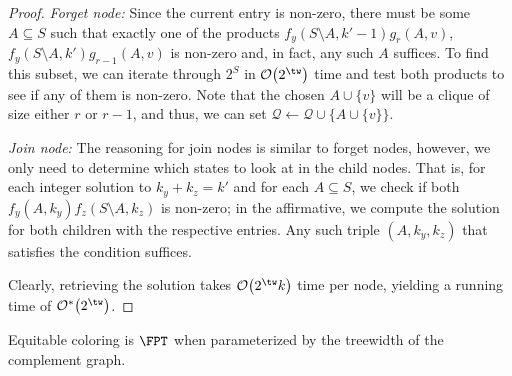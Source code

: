 \begin{proof}
    \emph{Forget node:} Since the current entry is non-zero, there must be some $A \subseteq S$ such that exactly one of the products $f_y(S \setminus A, k' - 1)g_r(A, v)$, $f_y(S \setminus A, k')g_{r-1}(A, v)$ is non-zero and, in fact, any such $A$ suffices.
    To find this subset, we can iterate through $2^S$ in $\bigO{2^\tw}$ time and test both products to see if any of them is non-zero.
    Note that the chosen $A \cup \{v\}$ will be a clique of size either $r$ or $r-1$, and thus, we can set $\mathcal{Q} \gets \mathcal{Q} \cup \{A \cup \{v\}\}$.
        
    \emph{Join node:} The reasoning for join nodes is similar to forget nodes, however, we only need to determine which states to look at in the child nodes.
    That is, for each integer solution to $k_y + k_z = k'$ and for each $A \subseteq S$, we check if both $f_y(A, k_y)f_z(S \setminus A, k_z)$ is non-zero; in the affirmative, we compute the solution for both children with the respective entries.
    Any such triple $(A, k_y, k_z)$ that satisfies the condition suffices.
    
    Clearly, retrieving the solution takes $\bigO{2^\tw k}$ time per node, yielding a running time of $\bigOs{2^\tw}$.
\end{proof}

\begin{corollary}
    Equitable coloring is $\FPT$ when parameterized by the treewidth of the complement graph.
\end{corollary}
